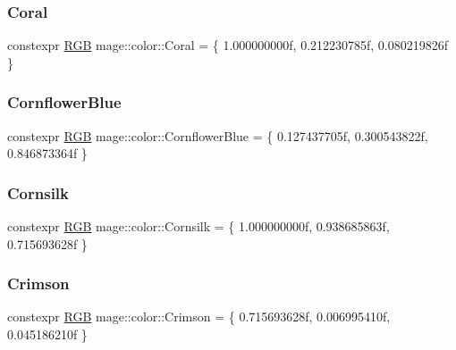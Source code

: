 \subsubsection{\texorpdfstring{Coral}{Coral}}
{\footnotesize\ttfamily constexpr \mbox{\hyperlink{structmage_1_1_r_g_b}{R\+GB}} mage\+::color\+::\+Coral = \{ 1.\+000000000f, 0.\+212230785f, 0.\+080219826f \}}

\mbox{\label{namespacemage_1_1color_a6b4ca119db23d03d1c5bc912c87b6348}} 
\subsubsection{\texorpdfstring{Cornflower\+Blue}{CornflowerBlue}}
{\footnotesize\ttfamily constexpr \mbox{\hyperlink{structmage_1_1_r_g_b}{R\+GB}} mage\+::color\+::\+Cornflower\+Blue = \{ 0.\+127437705f, 0.\+300543822f, 0.\+846873364f \}}

\mbox{\label{namespacemage_1_1color_ace73c8ed652093ab4cce3af40a8efe1a}} 
\subsubsection{\texorpdfstring{Cornsilk}{Cornsilk}}
{\footnotesize\ttfamily constexpr \mbox{\hyperlink{structmage_1_1_r_g_b}{R\+GB}} mage\+::color\+::\+Cornsilk = \{ 1.\+000000000f, 0.\+938685863f, 0.\+715693628f \}}

\mbox{\label{namespacemage_1_1color_a3855cb93401fa7336108eac1f9b8c0c7}} 
\subsubsection{\texorpdfstring{Crimson}{Crimson}}
{\footnotesize\ttfamily constexpr \mbox{\hyperlink{structmage_1_1_r_g_b}{R\+GB}} mage\+::color\+::\+Crimson = \{ 0.\+715693628f, 0.\+006995410f, 0.\+045186210f \}}

\mbox{\label{namespacemage_1_1color_a2b9093d5d06a4a0421cb602c22deadb5}} 
